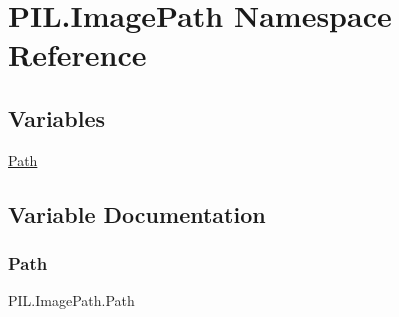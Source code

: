 \hypertarget{namespacePIL_1_1ImagePath}{}\section{P\+I\+L.\+Image\+Path Namespace Reference}
\label{namespacePIL_1_1ImagePath}
\subsection*{Variables}
\begin{DoxyCompactItemize}
\item 
\hyperlink{namespacePIL_1_1ImagePath_a580a62d0170d5588fd51c541665037db}{Path}
\end{DoxyCompactItemize}


\subsection{Variable Documentation}
\mbox{\label{namespacePIL_1_1ImagePath_a580a62d0170d5588fd51c541665037db}} 
\subsubsection{\texorpdfstring{Path}{Path}}
{\footnotesize\ttfamily P\+I\+L.\+Image\+Path.\+Path}

